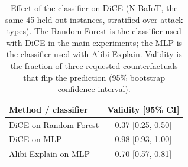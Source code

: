\begin{table}[t]
\centering
\caption{Effect of the classifier on DiCE (N-BaIoT, the same 45 held-out instances, stratified over attack types). The Random Forest is the classifier used with DiCE in the main experiments; the MLP is the classifier used with Alibi-Explain. Validity is the fraction of three requested counterfactuals that flip the prediction (95\% bootstrap confidence interval).}
\label{tab:ext-clf}
\scriptsize
\setlength{\tabcolsep}{4pt}
\begin{tabular}{@{}l c@{}}
\toprule
\textbf{Method / classifier} & \textbf{Validity [95\% CI]} \\
\midrule
DiCE on Random Forest & 0.37 [0.25, 0.50] \\
DiCE on MLP & 0.98 [0.93, 1.00] \\
Alibi-Explain on MLP & 0.70 [0.57, 0.81] \\
\bottomrule
\end{tabular}
\end{table}
